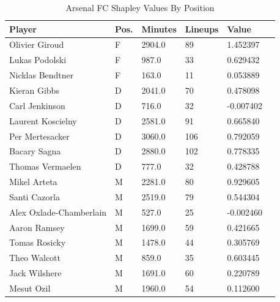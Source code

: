 \documentclass[a4paper,10pt]{article}
\begin{document}
  {\renewcommand{\arraystretch}{1.5}
  \begin{table}
    \begin{tabular*}{\textwidth}{@{\extracolsep{\fill} } l l l l l l}
      Player & Pos. & Minutes & Lineups & Value\\
      \hline
      Olivier Giroud & F & 2904.0 & 89 & 1.452397 \\
      Lukas Podolski & F & 987.0 & 33 & 0.629432 \\
      Nicklas Bendtner & F & 163.0 & 11 & 0.053889 \\
      \hline
      Kieran Gibbs & D & 2041.0 & 70 & 0.478098 \\
      Carl Jenkinson & D & 716.0 & 32 & -0.007402 \\
      Laurent Koscielny & D & 2581.0 & 91 & 0.665840 \\
      Per Mertesacker & D & 3060.0 & 106 & 0.792059 \\
      Bacary Sagna & D & 2880.0 & 102 & 0.778335 \\
      Thomas Vermaelen & D & 777.0 & 32 & 0.428788 \\
      \hline
      Mikel Arteta & M & 2281.0 & 80 & 0.929605 \\
      Santi Cazorla & M & 2519.0 & 79 & 0.544304 \\
      Alex Oxlade-Chamberlain & M & 527.0 & 25 & -0.002460 \\
      Aaron Ramsey & M & 1699.0 & 59 & 0.421665 \\
      Tomas Rosicky & M & 1478.0 & 44 & 0.305769 \\
      Theo Walcott & M & 859.0 & 35 & 0.603445 \\
      Jack Wilshere & M & 1691.0 & 60 & 0.220789 \\
      Mesut Ozil & M & 1960.0 & 54 & 0.112600 \\
    \end{tabular*}
    \caption{Arsenal FC Shapley Values By Position}
  \end{table}
  }
  
  \newpage
  
\end{document}
